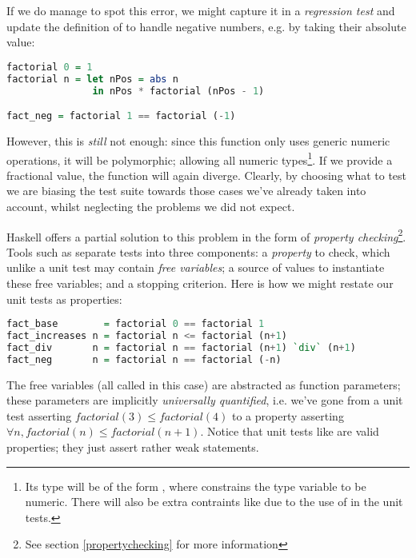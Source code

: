 If we do manage to spot this error, we might capture it in a \emph{regression test} and update the definition of  to handle negative numbers, e.g. by taking their absolute value:

\begin{lstlisting}[language=Haskell, xleftmargin=.2\textwidth, xrightmargin=.2\textwidth]
factorial 0 = 1
factorial n = let nPos = abs n
               in nPos * factorial (nPos - 1)

fact_neg = factorial 1 == factorial (-1)
\end{lstlisting}

However, this is \emph{still} not enough: since this function only uses generic numeric operations, it will be polymorphic; allowing all numeric types\footnote{Its type will be of the form , where  constrains the type variable  to be numeric. There will also be extra contraints like  due to the use of \hs{==} in the unit tests.}. If we provide a fractional value, the function will again diverge. Clearly, by choosing what to test we are biasing the test suite towards those cases we've already taken into account, whilst neglecting the problems we did not expect.

Haskell offers a partial solution to this problem in the form of \emph{property checking}\footnote{See section \ref{propertychecking} for more information}. Tools such as \qcheck{} separate tests into three components: a \emph{property} to check, which unlike a unit test may contain \emph{free variables}; a source of values to instantiate these free variables; and a stopping criterion. Here is how we might restate our unit tests as properties:

\begin{lstlisting}[language=Haskell, xleftmargin=.2\textwidth, xrightmargin=.2\textwidth]
fact_base        = factorial 0 == factorial 1
fact_increases n = factorial n <= factorial (n+1)
fact_div       n = factorial n == factorial (n+1) `div` (n+1)
fact_neg       n = factorial n == factorial (-n)
\end{lstlisting}

The free variables (all called  in this case) are abstracted as function parameters; these parameters are implicitly \emph{universally quantified}, i.e. we've gone from a unit test asserting $factorial(3) \leq factorial(4)$ to a property asserting $\forall n, factorial(n) \leq factorial(n+1)$. Notice that unit tests like  are valid properties; they just assert rather weak statements.

